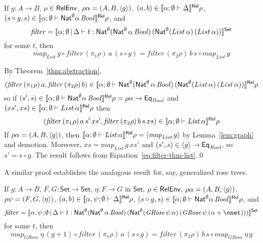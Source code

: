 \documentclass{lmcs}
\theoremstyle{plain}\newtheorem{satz}[thm]{Satz}
\newcommand{\set}{\mathsf{Set}}
\newcommand{\semmap}{\mathit{map}}
\newcommand{\filtype}{\Nat^\emptyset 
 (\Nat^\emptyset \, \alpha \, \mathit{Bool})\, (\Nat^\emptyset 
  (List \, \alpha) \, (List \, \alpha))}
\newcommand{\filtypeGRose}{\Nat^\emptyset 
 (\Nat^\emptyset \, \alpha \, \mathit{Bool})\, (\Nat^\emptyset 
  (\mathit{GRose}\,\psi \, \alpha) \, (\mathit{GRose}\,\psi \, (\alpha
  + \onet)))}
\begin{document}
\begin{thm} 
If $g : A \to B$, $\rho \in \mathsf{RelEnv}$, $\rho \alpha = (A, B, \langle {g} \rangle)$,
$(a, b) \in \llbracket{\alpha ;\emptyset \vdash \Delta}\rrbracket^{\mathsf{Rel}} \rho$, $(s \circ
g, s) \in \llbracket{\alpha; \emptyset \vdash \mathsf{Nat}^\emptyset \alpha \,
  \mathit{Bool}}\rrbracket^{\mathsf{Rel}} \rho$, and
\[\mathit{filter} = \setsem{\alpha; \emptyset \,|\, \Delta \vdash t :
  \filtype}\]
\noindent
for some $t$, then
\[  \mathit{map}_{\mathit{List}} \,g \circ \mathit{filter} \, (\pi_1
\rho) \, a \, (s \circ g) = \mathit{filter}\, (\pi_2\rho) \, b \, s
\circ \mathit{map}_{\mathit{List}} \,g\]
\end{thm}
\proof
By Theorem~\ref{thm:abstraction}, \[(\mathit{filter}\, (\pi_1 \rho)\,
a, \mathit{filter}\, (\pi_2 \rho)\, b) \in \relsem{\alpha; \emptyset
  \vdash \filtype} \rho\] so if $(s', s) \in \llbracket{\alpha; \emptyset
  \vdash \mathsf{Nat}^\emptyset \alpha \, \mathit{Bool}}\rrbracket^{\mathsf{Rel}} \rho = \rho\alpha \to
\mathsf{Eq}_{\mathit{Bool}}$ and $(xs', xs) \in \llbracket{\alpha; \emptyset
  \vdash List \, \alpha}\rrbracket^{\mathsf{Rel}} \rho$ then
\begin{equation}\label{eq:filter-thm-list}
  (\mathit{filter}\, (\pi_1\rho) \,a \,s' \,xs', \mathit{filter} \,
  (\pi_2\rho) \,b \,s \,xs) \in \llbracket{\alpha; \emptyset \vdash
    \mathit{List} \, \alpha}\rrbracket^{\mathsf{Rel}} \rho
\end{equation}
If $\rho\alpha = (A, B, \langle {g} \rangle)$, then $\llbracket{\alpha; \emptyset
  \vdash \mathit{List} \, \alpha}\rrbracket^{\mathsf{Rel}} \rho =
\langle {\mathit{map}_{\mathit{List}} \, g} \rangle$ by Lemma~\ref{lem:graph}
and demotion.  Moreover, $xs =
\mathit{map}_{\mathit{List}} \,g \,xs'$ and $(s', s) \in \langle {g} \rangle \to
\mathsf{Eq}_{\mathit{Bool}}$, so $s' = s \circ g$. The result
follows from 
Equation~\ref{eq:filter-thm-list}.\qed

A similar proof establishes the analogous result for, say, generalized
rose trees. 
\begin{thm} 
  If $g : A \to B$,
$F, G : \set \to \set$,
  $\eta : F \to G$ in $\set$, $\rho \in \mathsf{RelEnv}$, $\rho \alpha =
 (A, B, \langle {g} \rangle)$, $\rho \psi = (F, G, \langle {\eta} \rangle)$, $(a, b) \in
 \llbracket{\alpha, \psi ;\emptyset \vdash \Delta}\rrbracket^{\mathsf{Rel}} \rho$, $(s \circ
 g, s) \in \llbracket{\alpha; \emptyset \vdash \mathsf{Nat}^\emptyset \alpha \,
   \mathit{Bool}}\rrbracket^{\mathsf{Rel}} \rho$, and
 \[ \mathit{filter} = \setsem{\alpha, \psi; \emptyset \,|\, \Delta
      \vdash t : \filtypeGRose}  \]
for some $t$, then
\[ \semmap_{\mathit{GRose}}\, \eta\, (g + 1) \circ \mathit{filter} \,
(\pi_1 \rho) \, a \, (s \circ g) = \mathit{filter} \, (\pi_2\rho) \, b
\, s \circ 
\semmap_{\mathit{GRose}}\, \eta\, g\]
\end{thm}
\end{document}
